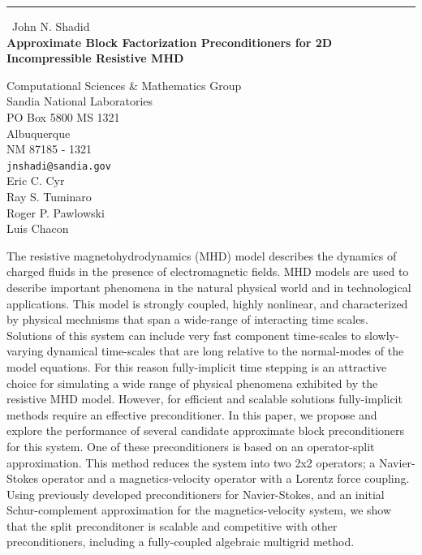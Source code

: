 \documentclass{report}
\begin{document}
\begin{center}
\rule{6in}{1pt} \
{\large John N. Shadid \\
{\bf Approximate Block Factorization Preconditioners for 2D Incompressible Resistive MHD}}

Computational Sciences & Mathematics Group \\ Sandia National Laboratories \\ PO Box 5800 MS 1321 \\ Albuquerque \\ NM 87185 - 1321
\\
{\tt jnshadi@sandia.gov}\\
Eric C. Cyr \\
Ray S. Tuminaro\\
Roger P. Pawlowski\\
Luis  Chacon\end{center}

The resistive magnetohydrodynamics (MHD) model describes the dynamics of
charged fluids in the presence of electromagnetic fields. MHD models are
used to describe important phenomena in the natural physical world and in
technological applications.
This model is strongly coupled, highly nonlinear, and characterized by
physical mechnisms that span a wide-range of interacting time scales.
Solutions of this system can include very fast component time-scales to
slowly-varying dynamical time-scales that are long relative to the
normal-modes of the model equations. For this reason fully-implicit time
stepping is an attractive choice for simulating a wide range of physical
phenomena exhibited by the resistive MHD model. However, for efficient
and scalable solutions fully-implicit methods require an effective
preconditioner. In this paper, we propose and explore the
performance of several candidate approximate block preconditioners for
this system. One of these preconditioners is based
on an operator-split approximation. This method reduces the system into
two 2x2 operators; a Navier-Stokes operator and a magnetics-velocity
operator with a Lorentz force coupling. Using previously
developed preconditioners for Navier-Stokes, and an initial
Schur-complement approximation for the magnetics-velocity system, we show
that the split preconditoner is scalable and
competitive with other preconditioners, including a fully-coupled
algebraic multigrid method.
\end{document}

